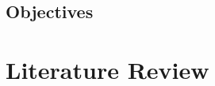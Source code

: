 \documentclass[12pt]{article}
\begin{document}








\subsection{Objectives}


\section{Literature Review}









\end{document}
